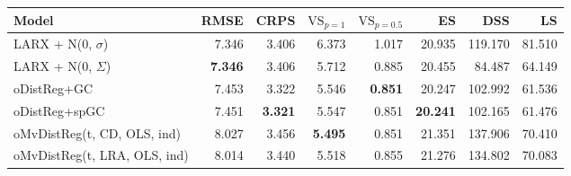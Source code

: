 \begin{tabular}{lrrrrrrr}
\toprule
Model & RMSE & CRPS & $\text{VS}_{p=1}$ & $\text{VS}_{p=0.5}$ & ES & DSS & LS \\
\midrule
LARX + N(0, $\sigma$) & {\cellcolor[HTML]{30123B}} \color[HTML]{F1F1F1} 7.346 & {\cellcolor[HTML]{4773EB}} \color[HTML]{F1F1F1} 3.406 & {\cellcolor[HTML]{AC1701}} \color[HTML]{F1F1F1} 6.373 & {\cellcolor[HTML]{7A0403}} \color[HTML]{F1F1F1} 1.017 & {\cellcolor[HTML]{448FFE}} \color[HTML]{F1F1F1} 20.935 & {\cellcolor[HTML]{FABA39}} \color[HTML]{000000} 119.170 & {\cellcolor[HTML]{7A0403}} \color[HTML]{F1F1F1} 81.510 \\
LARX + N(0, $\Sigma$) & {\cellcolor[HTML]{30123B}} \color[HTML]{F1F1F1} \bfseries 7.346 & {\cellcolor[HTML]{4773EB}} \color[HTML]{F1F1F1} 3.406 & {\cellcolor[HTML]{31AFF5}} \color[HTML]{F1F1F1} 5.712 & {\cellcolor[HTML]{3BA0FD}} \color[HTML]{F1F1F1} 0.885 & {\cellcolor[HTML]{3F3B97}} \color[HTML]{F1F1F1} 20.455 & {\cellcolor[HTML]{3E3891}} \color[HTML]{F1F1F1} 84.487 & {\cellcolor[HTML]{1CE6B4}} \color[HTML]{000000} 64.149 \\
oDistReg+GC & {\cellcolor[HTML]{4146AC}} \color[HTML]{F1F1F1} 7.453 & {\cellcolor[HTML]{30123B}} \color[HTML]{F1F1F1} 3.322 & {\cellcolor[HTML]{3E3891}} \color[HTML]{F1F1F1} 5.546 & {\cellcolor[HTML]{30123B}} \color[HTML]{F1F1F1} \bfseries 0.851 & {\cellcolor[HTML]{30123B}} \color[HTML]{F1F1F1} 20.247 & {\cellcolor[HTML]{35F394}} \color[HTML]{000000} 102.992 & {\cellcolor[HTML]{2FB2F4}} \color[HTML]{F1F1F1} 61.536 \\
oDistReg+spGC & {\cellcolor[HTML]{4143A7}} \color[HTML]{F1F1F1} 7.451 & {\cellcolor[HTML]{30123B}} \color[HTML]{F1F1F1} \bfseries 3.321 & {\cellcolor[HTML]{3F3B97}} \color[HTML]{F1F1F1} 5.547 & {\cellcolor[HTML]{30123B}} \color[HTML]{F1F1F1} 0.851 & {\cellcolor[HTML]{30123B}} \color[HTML]{F1F1F1} \bfseries 20.241 & {\cellcolor[HTML]{2AEFA1}} \color[HTML]{000000} 102.165 & {\cellcolor[HTML]{31AFF5}} \color[HTML]{F1F1F1} 61.476 \\
oMvDistReg(t, CD, OLS, ind) & {\cellcolor[HTML]{79FE59}} \color[HTML]{000000} 8.027 & {\cellcolor[HTML]{37A8FA}} \color[HTML]{F1F1F1} 3.456 & {\cellcolor[HTML]{30123B}} \color[HTML]{F1F1F1} \bfseries 5.495 & {\cellcolor[HTML]{30123B}} \color[HTML]{F1F1F1} 0.851 & {\cellcolor[HTML]{1AD2D2}} \color[HTML]{000000} 21.351 & {\cellcolor[HTML]{7A0403}} \color[HTML]{F1F1F1} 137.906 & {\cellcolor[HTML]{D4E735}} \color[HTML]{000000} 70.410 \\
oMvDistReg(t, LRA, OLS, ind) & {\cellcolor[HTML]{71FE5F}} \color[HTML]{000000} 8.014 & {\cellcolor[HTML]{4196FF}} \color[HTML]{F1F1F1} 3.440 & {\cellcolor[HTML]{372466}} \color[HTML]{F1F1F1} 5.518 & {\cellcolor[HTML]{38276D}} \color[HTML]{F1F1F1} 0.855 & {\cellcolor[HTML]{20C7DF}} \color[HTML]{000000} 21.276 & {\cellcolor[HTML]{A71401}} \color[HTML]{F1F1F1} 134.802 & {\cellcolor[HTML]{CDEC34}} \color[HTML]{000000} 70.083 \\

\end{tabular}

